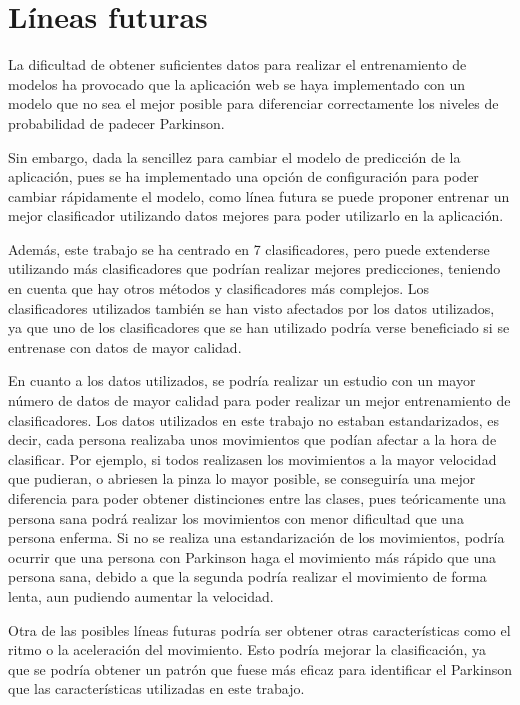  \section{Líneas futuras}
 La dificultad de obtener suficientes datos para realizar el entrenamiento de modelos ha provocado que la aplicación web se haya implementado con un modelo que no sea el mejor posible para diferenciar correctamente los niveles de probabilidad de padecer Parkinson.
 
 Sin embargo, dada la sencillez para cambiar el modelo de predicción de la aplicación, pues se ha implementado una opción de configuración para poder cambiar rápidamente el modelo, como línea futura se puede proponer entrenar un mejor clasificador utilizando datos mejores para poder utilizarlo en la aplicación.
 
 Además, este trabajo se ha centrado en 7 clasificadores, pero puede extenderse utilizando más clasificadores que podrían realizar mejores predicciones, teniendo en cuenta que hay otros métodos y clasificadores más complejos. Los clasificadores utilizados también se han visto afectados por los datos utilizados, ya que uno de los clasificadores que se han utilizado podría verse beneficiado si se entrenase con datos de mayor calidad. 
 
 En cuanto a los datos utilizados, se podría realizar un estudio con un mayor número de datos de mayor calidad para poder realizar un mejor entrenamiento de clasificadores. Los datos utilizados en este trabajo no estaban estandarizados, es decir, cada persona realizaba unos movimientos que podían afectar a la hora de clasificar. Por ejemplo, si todos realizasen los movimientos a la mayor velocidad que pudieran, o abriesen la pinza lo mayor posible, se conseguiría una mejor diferencia para poder obtener distinciones entre las clases, pues teóricamente una persona sana podrá realizar los movimientos con menor dificultad que una persona enferma. Si no se realiza una estandarización de los movimientos, podría ocurrir que una persona con Parkinson haga el movimiento más rápido que una persona sana, debido a que la segunda podría realizar el movimiento de forma lenta, aun pudiendo aumentar la velocidad.
 
 Otra de las posibles líneas futuras podría ser obtener otras características como el ritmo o la aceleración del movimiento. Esto podría mejorar la clasificación, ya que se podría obtener un patrón que fuese más eficaz para identificar el Parkinson que las características utilizadas en este trabajo.
